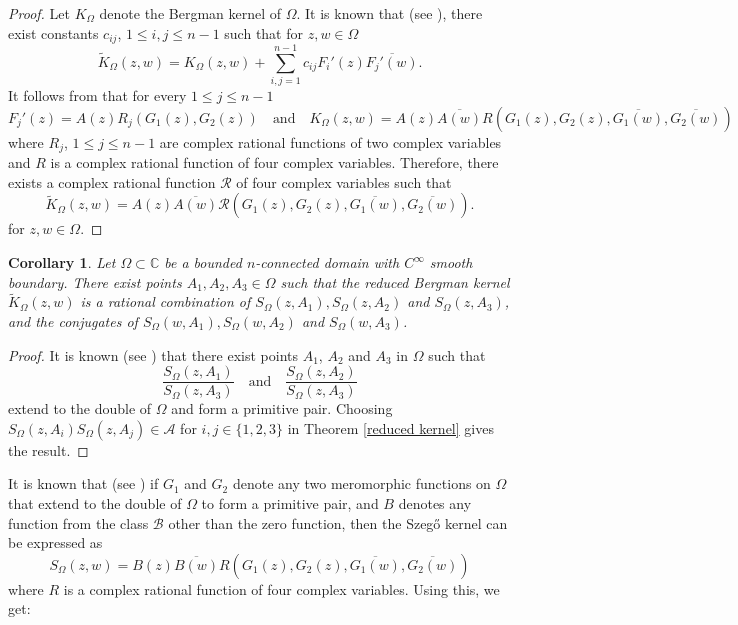\documentclass[11pt, reqno]{amsart}
\newtheorem{cor}[thm]{Corollary}
\numberwithin{equation}{section}
\begin{document}
\begin{proof}
Let $K_{\Omega}$ denote the Bergman kernel of $\Omega$. It is known that (see \cite{Bergman}), there exist constants $c_{ij}$, $1\leq i,j\leq n-1$ such that for $z,w\in\Omega$ 
\begin{equation}
\tilde{K}_{\Omega}(z,w) = K_{\Omega}(z,w) + \sum_{i,j=1}^{n-1} c_{ij} F_i'(z) \overline{F_j'(w)}.
\end{equation}
It follows from \cite{Be1} that for every $1\leq j\leq n-1$
\[
F_j'(z)=A(z)R_{j}(G_1(z),G_2(z))
\quad\text{and}\quad
K_{\Omega}(z,w)=A(z)\overline{A(w)} R(G_1(z),G_2(z),\overline{G_1(w)},\overline{G_2(w)})
\]
where $R_j$, $1\leq j\leq n-1$ are complex rational functions of two complex variables and $R$ is a complex rational function of four complex variables. Therefore, there exists a complex rational function $\mathcal{R}$ of four complex variables such that 
\begin{equation}
\tilde{K}_{\Omega}(z,w)=
A(z)\overline{A(w)} \mathcal{R}(G_1(z),G_2(z),\overline{G_1(w)},\overline{G_2(w)}).
\end{equation}
for $z, w \in \Omega$.
\end{proof}

\begin{cor}
Let $\Omega\subset\mathbb{C}$ be a bounded $n$-connected domain with $C^{\infty}$ smooth boundary. There exist points $A_1,A_2,A_3\in\Omega$ such that the reduced Bergman kernel $\tilde{K}_{\Omega}(z,w)$ is a rational combination of $S_{\Omega}(z,A_1),S_{\Omega}(z,A_2)$ and $S_{\Omega}(z,A_3)$, and the conjugates of $S_{\Omega}(w,A_1),S_{\Omega}(w,A_2)$ and $S_{\Omega}(w,A_3)$.
\end{cor}

\begin{proof}
It is known (see \cite{Be2}) that there exist points $A_1$, $A_2$ and $A_3$ in $\Omega$ such that
\[
\frac{S_{\Omega}(z,A_1)}{S_{\Omega}(z,A_3)}\quad\text{and}\quad\frac{S_{\Omega}(z,A_2)}{S_{\Omega}(z,A_3)}
\]
extend to the double of $\Omega$ and form a primitive pair. Choosing $S_{\Omega}(z,A_i)S_{\Omega}(z,A_j)\in\mathcal{A}$ for $i,j\in\{1,2,3\}$ in Theorem \ref{reduced kernel} gives the result.
\end{proof}

It is known that (see \cite{Be1}) if $G_1$ and $G_2$ denote any two meromorphic functions on $\Omega$ that extend to the double of $\Omega$ to form a primitive pair, and $B$ denotes any function from the class $\mathcal{B}$ other than the zero function, then the Szeg\H{o} kernel can be expressed as 
\begin{equation}
S_{\Omega}(z,w)=
B(z)\overline{B(w)} R(G_1(z),G_2(z),\overline{G_1(w)},\overline{G_2(w)})
\end{equation}
where $R$ is a complex rational function of four complex variables. Using this, we get:
\end{document}
